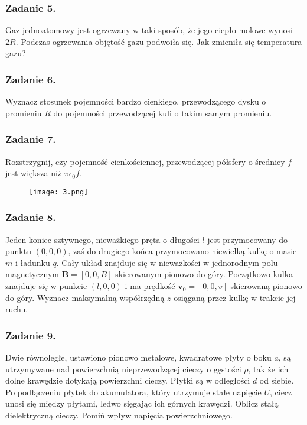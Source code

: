 \documentclass[a4paper, twocolumn]{article}
\begin{document}
\subsubsection*{Zadanie 5.} 
Gaz jednoatomowy jest ogrzewany w taki sposób, że jego ciepło molowe wynosi \(2R\). Podczas ogrzewania objętość gazu podwoiła się. Jak zmieniła się temperatura gazu?

\subsubsection*{Zadanie 6.}
Wyznacz stosunek pojemności bardzo cienkiego, przewodzącego dysku o promieniu \(R\) do pojemności przewodzącej kuli o takim samym promieniu.

\subsubsection*{Zadanie 7.} 
Rozstrzygnij, czy pojemność cienkościennej, przewodzącej półsfery o średnicy \(f\) jest większa niż \(\pi\epsilon_0f\).

\begin{figure}[ht]
    \centering
    \texttt{[image: 3.png]}
\end{figure}

\subsubsection*{Zadanie 8.}
Jeden koniec sztywnego, nieważkiego pręta o długości \(l\) jest przymocowany do punktu \((0,0,0)\), zaś do drugiego końca przymocowano niewielką kulkę o masie \(m\) i ładunku \(q\). Cały układ znajduje się w nieważkości w jednorodnym polu magnetycznym \(\mathbf{B}=[0,0,B]\) skierowanym pionowo do góry. Początkowo kulka znajduje się w punkcie \((l,0,0)\) i ma prędkość \(\mathbf{v}_0=[0,0,v]\) skierowaną pionowo do góry. Wyznacz maksymalną współrzędną \(z\) osiąganą przez kulkę w trakcie jej ruchu.
\newpage

\subsubsection*{Zadanie 9.}

Dwie równoległe, ustawiono pionowo metalowe, kwadratowe płyty o boku \(a\), są utrzymywane nad powierzchnią nieprzewodzącej cieczy o gęstości \(\rho\), tak że ich dolne krawędzie dotykają powierzchni cieczy. Płytki są w odległości \(d\) od siebie. Po podłączeniu płytek do akumulatora, który utrzymuje stałe napięcie \(U\), ciecz unosi się między płytami, ledwo sięgając ich górnych krawędzi. Oblicz stałą dielektryczną cieczy. Pomiń wpływ napięcia powierzchniowego.
\end{document}
